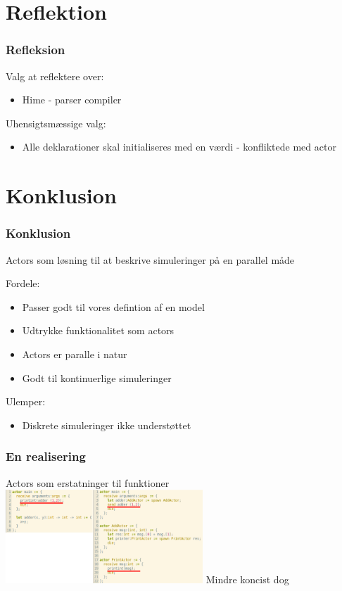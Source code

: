 \section{Reflektion}
\begin{frame}
	\frametitle{Refleksion}
	Valg at reflektere over:
	  \begin{itemize}
	    \item{Hime - parser compiler}
	  \end{itemize}
  Uhensigtsmæssige valg:
	  \begin{itemize}
	    \item Alle deklarationer skal initialiseres med en værdi - konfliktede med actor
	  \end{itemize}
\end{frame}

\section{Konklusion}
\begin{frame}
	\frametitle{Konklusion}
	Actors som løsning til at beskrive simuleringer på en parallel måde
	
	
  Fordele:
    \begin{itemize}
      \item Passer godt til vores defintion af en model
      \item Udtrykke funktionalitet som actors
      \item Actors er paralle i natur
      \item Godt til kontinuerlige simuleringer
    \end{itemize}
  Ulemper:
    \begin{itemize}
      \item Diskrete simuleringer ikke understøttet
    \end{itemize}
\end{frame}

\begin{frame}
	\frametitle{En realisering}
	Actors som erstatninger til funktioner
	\includegraphics[width=280px]{Images/actorFunc.png}\newline
	Mindre koncist dog
\end{frame}

